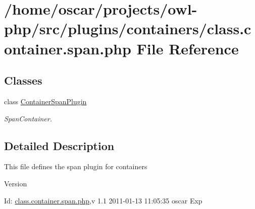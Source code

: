 \section{/home/oscar/projects/owl-\/php/src/plugins/containers/class.container.span.php File Reference}
\label{class_8container_8span_8php}
\subsection*{Classes}
\begin{DoxyCompactItemize}
\item 
class \hyperlink{classContainerSpanPlugin}{ContainerSpanPlugin}
\begin{DoxyCompactList}\small\item\em SpanContainer. \item\end{DoxyCompactList}\end{DoxyCompactItemize}


\subsection{Detailed Description}
This file defines the span plugin for containers \begin{DoxyVersion}{Version}

\end{DoxyVersion}
\begin{DoxyParagraph}{Id:}
\hyperlink{class_8container_8span_8php}{class.container.span.php},v 1.1 2011-\/01-\/13 11:05:35 oscar Exp 
\end{DoxyParagraph}

